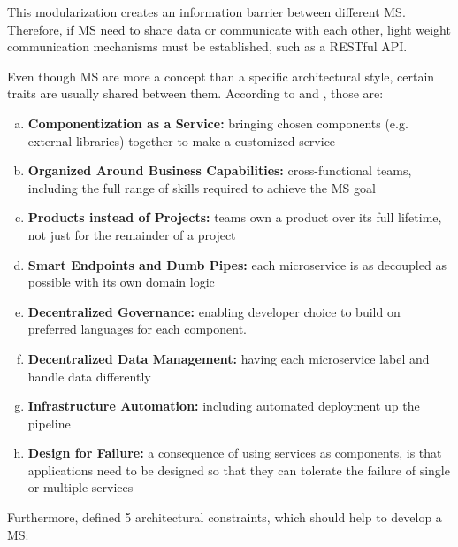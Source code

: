 This modularization creates an information barrier between different MS. Therefore, if MS need to share data or communicate with each other, light weight communication mechanisms must be established, such as a RESTful API\cite{Riggins15}.

Even though MS are more a concept than a specific architectural style, certain traits are usually shared between them\cite{Riggins15}. According to \cite{Riggins15} and \cite{Lewis14}, those are:

\begin{enumerate}[(a)]
	\item \textbf{Componentization as a Service:} bringing chosen components (e.g. external libraries) together to make a customized service
	\item \textbf{Organized Around Business Capabilities:} cross-functional teams, including the full range of skills required to achieve the MS goal
	\item \textbf{Products instead of Projects:} teams own a product over its full lifetime, not just for the remainder of a project
	\item \textbf{Smart Endpoints and Dumb Pipes:} each microservice is as decoupled as possible with its own domain logic
	\item \textbf{Decentralized Governance:} enabling developer choice to build on preferred languages for each component.
	\item \textbf{Decentralized Data Management:} having each microservice label and handle data differently
	\item \textbf{Infrastructure Automation:} including automated deployment up the pipeline
	\item \textbf{Design for Failure:} a consequence of using services as components, is that applications need to be designed so that they can tolerate the failure of single or multiple services
\end{enumerate}

Furthermore, \cite{Bugwadia15} defined 5 architectural constraints, which should help to develop a MS:

